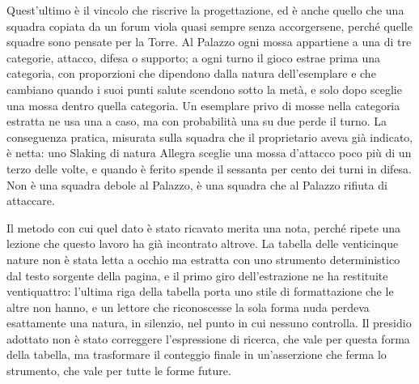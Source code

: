 Quest'ultimo è il vincolo che riscrive la progettazione, ed è anche quello che una squadra copiata da un forum viola quasi sempre senza accorgersene, perché quelle squadre sono pensate per la Torre. Al Palazzo ogni mossa appartiene a una di tre categorie, attacco, difesa o supporto; a ogni turno il gioco estrae prima una categoria, con proporzioni che dipendono dalla natura dell'esemplare e che cambiano quando i suoi punti salute scendono sotto la metà, e solo dopo sceglie una mossa dentro quella categoria. Un esemplare privo di mosse nella categoria estratta ne usa una a caso, ma con probabilità una su due perde il turno. La conseguenza pratica, misurata sulla squadra che il proprietario aveva già indicato, è netta: uno Slaking di natura Allegra sceglie una mossa d'attacco poco più di un terzo delle volte, e quando è ferito spende il sessanta per cento dei turni in difesa. Non è una squadra debole al Palazzo, è una squadra che al Palazzo rifiuta di attaccare.

Il metodo con cui quel dato è stato ricavato merita una nota, perché ripete una lezione che questo lavoro ha già incontrato altrove. La tabella delle venticinque nature non è stata letta a occhio ma estratta con uno strumento deterministico dal testo sorgente della pagina, e il primo giro dell'estrazione ne ha restituite ventiquattro: l'ultima riga della tabella porta uno stile di formattazione che le altre non hanno, e un lettore che riconoscesse la sola forma nuda perdeva esattamente una natura, in silenzio, nel punto in cui nessuno controlla. Il presidio adottato non è stato correggere l'espressione di ricerca, che vale per questa forma della tabella, ma trasformare il conteggio finale in un'asserzione che ferma lo strumento, che vale per tutte le forme future.

